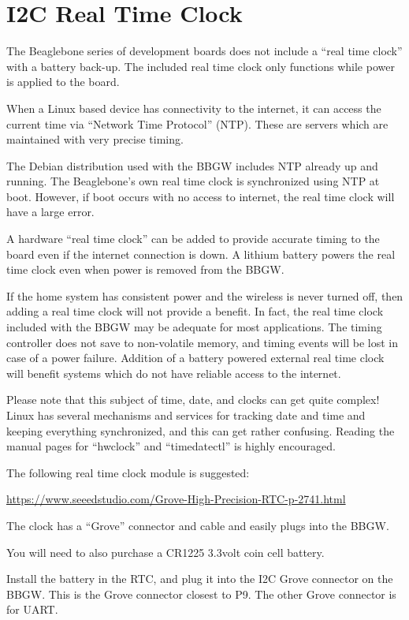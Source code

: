 \chapter{I2C Real Time Clock}

The Beaglebone series of development boards does not include a ``real time clock'' with a battery back-up.  The included real time clock only functions while power is applied to the board.

When a Linux based device has connectivity to the internet, it can access the current time via ``Network Time Protocol'' (NTP).  These are servers which are maintained with very precise timing.

The Debian distribution used with the BBGW includes NTP already up and running.  The Beaglebone's own real time clock is synchronized using NTP at boot.  However, if boot occurs with no access to internet, the real time clock will have a large error.

A hardware ``real time clock'' can be added to provide accurate timing to the board even if the internet connection is down.  A lithium battery powers the real time clock even when power is removed from the BBGW.

If the home system has consistent power and the wireless is never turned off, then adding a real time clock will not provide a benefit.  In fact, the real time clock included with the BBGW may be adequate for most applications.  The timing controller does not save to non-volatile memory, and timing events will be lost in case of a power failure.  Addition of a battery powered external real time clock will benefit systems which do not have reliable access to the internet.

Please note that this subject of time, date, and clocks can get quite complex!  Linux has several mechanisms and services for tracking date and time and keeping everything synchronized, and this can get rather confusing.  Reading the manual pages for ``hwclock'' and ``timedatectl'' is highly encouraged.

The following real time clock module is suggested:

\url{https://www.seeedstudio.com/Grove-High-Precision-RTC-p-2741.html}

The clock has a ``Grove'' connector and cable and easily plugs into the BBGW.

You will need to also purchase a CR1225 3.3volt coin cell battery.

Install the battery in the RTC, and plug it into the I2C Grove connector on the BBGW.  This is the Grove connector closest to P9.  The other Grove connector is for UART.

